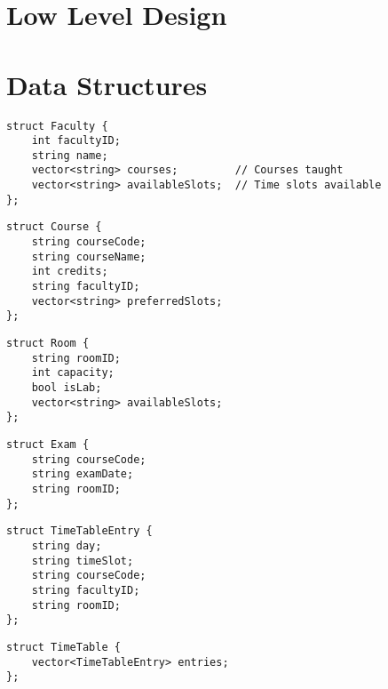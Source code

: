\documentclass[12pt]{article}
\begin{document}
\newpage
\section{Low Level Design}




\section*{Data Structures}

\begin{lstlisting}[style=cppstyle, caption=Faculty Information]
struct Faculty {
    int facultyID;
    string name;
    vector<string> courses;         // Courses taught
    vector<string> availableSlots;  // Time slots available
};
\end{lstlisting}

\begin{lstlisting}[style=cppstyle, caption=Course Information]
struct Course {
    string courseCode;
    string courseName;
    int credits;
    string facultyID;
    vector<string> preferredSlots;
};
\end{lstlisting}

\begin{lstlisting}[style=cppstyle, caption=Classroom/Lab Information]
struct Room {
    string roomID;
    int capacity;
    bool isLab;
    vector<string> availableSlots;
};
\end{lstlisting}

\begin{lstlisting}[style=cppstyle, caption=Exam Information]
struct Exam {
    string courseCode;
    string examDate;
    string roomID;
};
\end{lstlisting}

\begin{lstlisting}[style=cppstyle, caption=Timetable Entry]
struct TimeTableEntry {
    string day;
    string timeSlot;
    string courseCode;
    string facultyID;
    string roomID;
};
\end{lstlisting}

\begin{lstlisting}[style=cppstyle, caption=Timetable]
struct TimeTable {
    vector<TimeTableEntry> entries;
};
\end{lstlisting}
\end{document}
